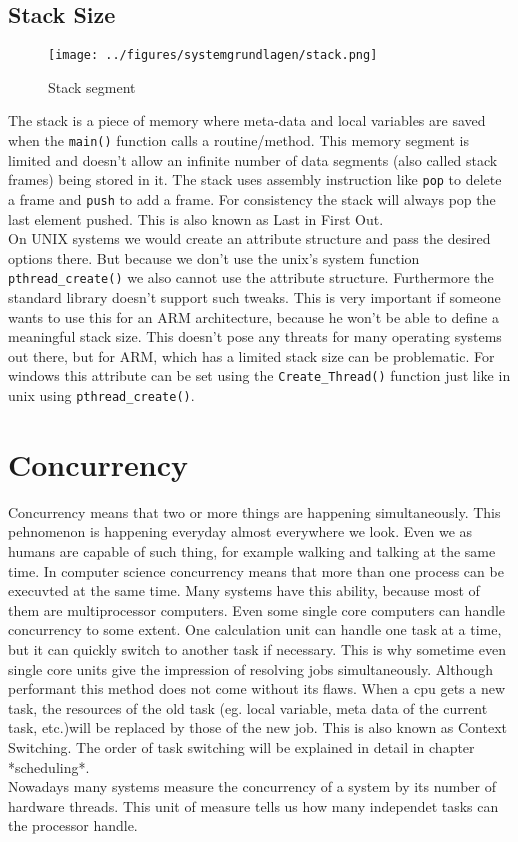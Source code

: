 \subsection{Stack Size}
\begin{wrapfigure}{1}{0.5\textwidth}
	\centering
	\texttt{[image: ../figures/systemgrundlagen/stack.png]}
	\caption{Stack segment}
	\cite{stack}
\end{wrapfigure}
The stack is a piece of memory where meta-data and local variables are saved when the \texttt{main()} function calls a routine/method. This memory segment is limited and doesn't allow an infinite number of data segments (also called stack frames) being stored in it. The stack uses assembly instruction like \texttt{pop} to delete a frame and \texttt{push} to add a frame. For consistency the stack will always pop the last element pushed. This is also known as \dq Last in First Out\dq{}\cite{stack}.\\
On UNIX systems we would create an attribute structure and pass the
desired options there. But because we don't use the unix's system function \texttt{pthread\_create()} we also
cannot use the attribute structure. Furthermore the standard library doesn't support such tweaks. 
This is very important if someone wants to use this for an ARM architecture, because he won't be
able to define a meaningful stack size. This doesn't pose any threats for many operating systems out
there, but for ARM, which has a limited stack size can be problematic. For windows this attribute
can be set using the \texttt{Create\_Thread()} function just like in unix using \texttt{pthread\_create()}.
\newpage
\section{Concurrency}
\label{ssec:concurrency}
Concurrency means that two or more things are happening simultaneously. This pehnomenon is happening
everyday almost everywhere we look. Even we as humans are capable of such thing, for example walking
and talking at the same time. In computer science concurrency means that more than one process can
be execuvted at the same time. Many systems have this ability, because most of them are
multiprocessor computers. Even some single core computers can handle concurrency to some extent.
One calculation unit can handle one task at a time, but it can quickly switch to another task if
necessary. This is why sometime even single core units give the impression of resolving jobs
simultaneously\cite{concurrency}. Although performant this method does not come without its flaws. When a cpu gets a new task, the resources of the old task (eg. local variable, meta data of the current task, etc.)will be replaced by those of the new job. This is also known as \dq Context Switching\dq{}.
The order of task switching will be explained in detail in chapter *scheduling*.\\ 
Nowadays many systems measure the concurrency of a system by its number of hardware threads. This
unit of measure tells us how many independet tasks can the processor handle.
